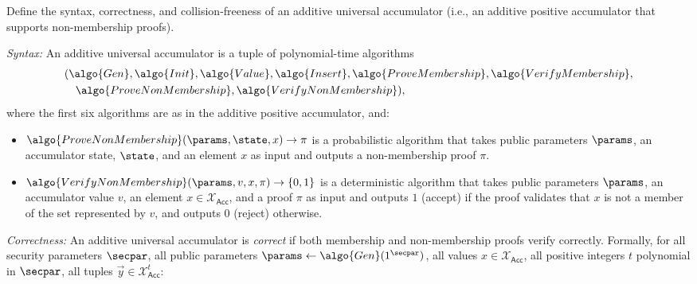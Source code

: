 \begin{exercise}
  Define the syntax, correctness, and collision-freeness of an additive universal accumulator (i.e., an additive positive accumulator that supports non-membership proofs).
\end{exercise}

\ifsolutions
\begin{mysolution}
  \emph{Syntax:} An additive universal accumulator is a tuple of polynomial-time algorithms 
  \begin{align*}
    &(\algo{Gen}, \algo{Init}, \algo{Value}, \algo{Insert}, \algo{ProveMembership}, \algo{VerifyMembership},\\
    &\quad \algo{ProveNonMembership}, \algo{VerifyNonMembership}),
  \end{align*}
  where the first six algorithms are as in the additive positive accumulator, and:
  \begin{itemize}
    \item $\algo{ProveNonMembership}(\params, \state, x) \rightarrow \pi$ is a probabilistic algorithm that takes public parameters $\params$, an accumulator state, $\state$, and an element $x$ as input and outputs a non-membership proof $\pi$.
    \item $\algo{VerifyNonMembership}(\params, v, x, \pi) \rightarrow \{0, 1\}$ is a deterministic algorithm that takes public parameters $\params$, an accumulator value $v$, an element $x \in \mathcal{X}_\mathsf{Acc}$, and a proof $\pi$ as input and outputs $1$ (accept) if the proof validates that $x$ is not a member of the set represented by $v$, and outputs $0$ (reject) otherwise.
  \end{itemize}
  
  \emph{Correctness:} An additive universal accumulator is \emph{correct} if both membership and non-membership proofs verify correctly.
  Formally, for all security parameters $\secpar$, all public parameters $\params \gets \algo{Gen}(1^\secpar)$, all values $x \in \mathcal{X}_\mathsf{Acc}$, all positive integers $t$ polynomial in $\secpar$, all tuples $\vec{y} \in \mathcal{X}_\mathsf{Acc}^{t}$:
  

\end{mysolution}
